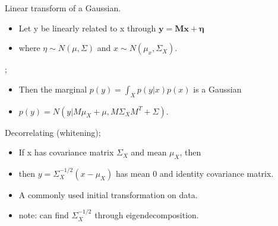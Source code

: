 \documentclass{article}
\begin{document}
Linear transform of a Gaussian. \begin{itemize} \item Let y be linearly related to x through $\mathbf{y = Mx + \eta}$ \item where $\eta \sim N(\mu, \Sigma)$ and $x\sim N(\mu_x, \Sigma_X)$. \end{itemize}; \begin{itemize}\item Then the marginal $p(y)=\int_X p(y|x)p(x)$ is a Gaussian \item $p(y) = N(y|M\mu_X + \mu, M\Sigma_XM^T+\Sigma)$. \end{itemize}

Decorrelating (whitening); \begin{itemize} \item If x has covariance matrix $\Sigma_X$ and mean $\mu_X$, then  \item then $y=\Sigma_X^{-1/2}(x-\mu_X)$ has mean 0 and identity covariance matrix. \item A commonly used initial transformation on data. \item note: can find $\Sigma_X^{-1/2}$ through eigendecomposition. \end{itemize}
\end{document}

